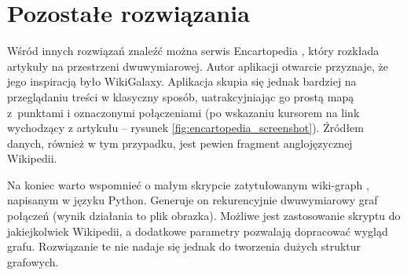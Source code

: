 \section{Pozostałe rozwiązania}

Wśród innych rozwiązań znaleźć można serwis Encartopedia \cite{Encartopedia}, który rozkłada artykuły na przestrzeni dwuwymiarowej. Autor aplikacji otwarcie przyznaje, że jego inspiracją było WikiGalaxy. Aplikacja skupia się jednak bardziej na przeglądaniu treści w klasyczny sposób, uatrakcyjniając go prostą mapą z~punktami i oznaczonymi połączeniami (po wskazaniu kursorem na link wychodzący z artykułu – rysunek \ref{fig:encartopedia_screenshot}). Źródłem danych, również w tym przypadku, jest pewien fragment anglojęzycznej Wikipedii.


Na koniec warto wspomnieć o małym skrypcie zatytułowanym wiki-graph \cite{WikiGraphPython}, napisanym w języku Python. Generuje on rekurencyjnie dwuwymiarowy graf połączeń (wynik działania to plik obrazka). Możliwe jest zastosowanie skryptu do jakiejkolwiek Wikipedii, a dodatkowe parametry pozwalają dopracować wygląd grafu. Rozwiązanie te nie nadaje się jednak do tworzenia dużych struktur grafowych.